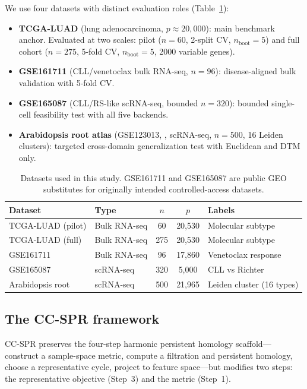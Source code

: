 \documentclass[12pt]{article}
\begin{document}
We use four datasets with distinct evaluation roles (Table~\ref{tab:datasets}):
\begin{itemize}[leftmargin=1.5em]
\item \textbf{TCGA-LUAD} (lung adenocarcinoma, $p \approx 20{,}000$): main benchmark anchor.
Evaluated at two scales: pilot ($n = 60$, 2-split CV, $n_{\text{boot}} = 5$) and full cohort ($n = 275$, 5-fold CV, $n_{\text{boot}} = 5$, 2000 variable genes).
\item \textbf{GSE161711} (CLL/venetoclax bulk RNA-seq, $n = 96$): disease-aligned bulk validation with 5-fold CV.
\item \textbf{GSE165087} (CLL/RS-like scRNA-seq, bounded $n = 320$): bounded single-cell feasibility test with all five backends.
\item \textbf{Arabidopsis root atlas} (GSE123013, \citealt{denyer2019}, scRNA-seq, $n = 500$, 16 Leiden clusters): targeted cross-domain generalization test with Euclidean and DTM only.
\end{itemize}

\begin{table}[h]
\centering\small
\begin{tabular}{llccl}
\toprule
Dataset & Type & $n$ & $p$ & Labels \\
\midrule
TCGA-LUAD (pilot) & Bulk RNA-seq & 60 & 20,530 & Molecular subtype \\
TCGA-LUAD (full) & Bulk RNA-seq & 275 & 20,530 & Molecular subtype \\
GSE161711 & Bulk RNA-seq & 96 & 17,860 & Venetoclax response \\
GSE165087 & scRNA-seq & 320 & 5,000 & CLL vs Richter \\
Arabidopsis root & scRNA-seq & 500 & 21,965 & Leiden cluster (16 types) \\
\bottomrule
\end{tabular}
\caption{Datasets used in this study. GSE161711 and GSE165087 are public GEO substitutes for originally intended controlled-access datasets.}
\label{tab:datasets}
\end{table}

\subsection{The CC-SPR framework}
\label{sec:ccspr_framework}

CC-SPR preserves the four-step harmonic persistent homology scaffold---construct a sample-space metric, compute a filtration and persistent homology, choose a representative cycle, project to feature space---but modifies two steps: the representative objective (Step~3) and the metric (Step~1).
\end{document}
